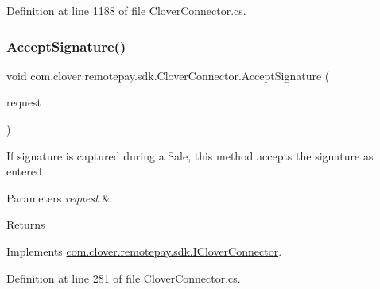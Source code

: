 Definition at line 1188 of file Clover\+Connector.\+cs.

\mbox{\label{classcom_1_1clover_1_1remotepay_1_1sdk_1_1_clover_connector_a2d54a7e1d05451c3335fe31337a56ea4}} 
\subsubsection{\texorpdfstring{Accept\+Signature()}{AcceptSignature()}}
{\footnotesize\ttfamily void com.\+clover.\+remotepay.\+sdk.\+Clover\+Connector.\+Accept\+Signature (\begin{DoxyParamCaption}\item[{\hyperlink{classcom_1_1clover_1_1remotepay_1_1sdk_1_1_verify_signature_request}{Verify\+Signature\+Request}}]{request }\end{DoxyParamCaption})}



If signature is captured during a Sale, this method accepts the signature as entered 


\begin{DoxyParams}{Parameters}
{\em request} & \\
\hline
\end{DoxyParams}
\begin{DoxyReturn}{Returns}

\end{DoxyReturn}


Implements \hyperlink{interfacecom_1_1clover_1_1remotepay_1_1sdk_1_1_i_clover_connector_ab31791ce69e05ca2e2b15269c2010a15}{com.\+clover.\+remotepay.\+sdk.\+I\+Clover\+Connector}.



Definition at line 281 of file Clover\+Connector.\+cs.

\mbox{\label{classcom_1_1clover_1_1remotepay_1_1sdk_1_1_clover_connector_aebd32d30edf2691cafd56d8540597d9a}} 
